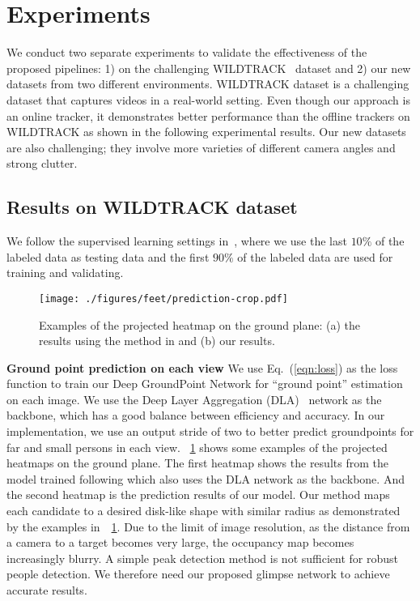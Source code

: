 \documentclass{article}
\begin{document}
\section{Experiments}
We conduct two separate experiments to validate the effectiveness of the proposed pipelines: 1) on the challenging WILDTRACK~\cite{chavdarova2018wildtrack}  dataset and 2) our new datasets from two different environments.
WILDTRACK dataset is a challenging dataset that captures videos in a real-world setting. Even though our approach is an online tracker, it demonstrates better performance than the
 offline trackers on WILDTRACK as shown in the following experimental results. Our new datasets are also challenging; they involve more varieties of different camera angles and strong clutter.
\subsection{Results on WILDTRACK dataset}
We follow the supervised learning settings in~\cite{chavdarova2018wildtrack}, where we use the last $10\%$ of the labeled data as testing data and the first $90\%$ of the labeled data are used for training and validating.

\begin{figure}[!htbp]
	\begin{center}
		\texttt{[image: ./figures/feet/prediction-crop.pdf]}
	\end{center}
	\caption{Examples of the projected heatmap on the ground plane: (a) the results using
	the method in \cite{zhou2019objects} and (b) our results. }
	\label{fig:feet:pred}
\end{figure}

\textbf{Ground point prediction on each view}
We use Eq.~(\ref{eqn:loss}) as the loss function to train our Deep GroundPoint Network for ``ground point'' estimation on each image. We use the Deep Layer Aggregation (DLA)~\cite{yu2018deep} network as
the backbone, which
has a good balance between efficiency and accuracy.
In our implementation, we use an output stride of two to better predict groundpoints for far and small persons in each view.
\figurename{~\ref{fig:feet:pred}} shows some examples of the projected heatmaps on the ground plane. The first heatmap shows the
results from the model trained following \cite{zhou2019objects} which also uses the DLA network
as the
backbone. And the second heatmap is the prediction results of our model.
Our method maps each candidate to a desired disk-like shape with similar radius
as demonstrated by the examples in~\figurename{~\ref{fig:feet:pred}}.
Due to the limit of image resolution, as the distance from a camera to a target becomes
very large, the occupancy map becomes increasingly blurry. A simple peak detection method is not sufficient
for robust people detection.
We therefore need our proposed glimpse network
to achieve accurate results.
\end{document}
